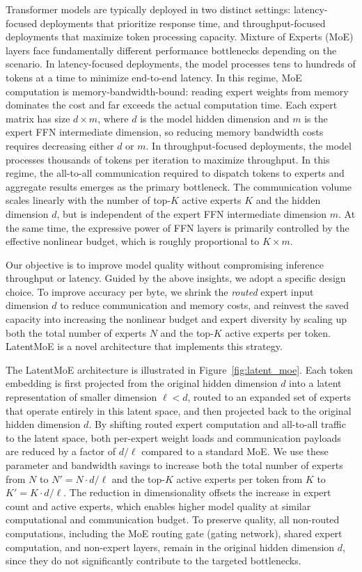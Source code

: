 \documentclass[11pt, logo, onecolumn, copyright, colorlinks=true, allcolors=blue]{nvidiatechreport}
\begin{document}
Transformer models are typically deployed in two distinct settings: latency-focused deployments that prioritize response time, and throughput-focused deployments that maximize token processing capacity.
Mixture of Experts (MoE) layers face fundamentally different performance bottlenecks depending on the scenario.
In latency-focused deployments, the model processes tens to hundreds of tokens at a time to minimize end-to-end latency. In this regime, MoE computation is memory-bandwidth-bound: reading expert weights from memory dominates the cost and far exceeds the actual computation time. Each expert matrix has size $d \times m$, where $d$ is the model hidden dimension and $m$ is the expert FFN intermediate dimension, so reducing memory bandwidth costs requires decreasing either $d$ or $m$.
In throughput-focused deployments, the model processes thousands of tokens per iteration to maximize throughput. In this regime, the all-to-all communication required to dispatch tokens to experts and aggregate results emerges as the primary bottleneck. The communication volume scales linearly with the number of top-$K$ active experts $K$ and the hidden dimension $d$, but is independent of the expert FFN intermediate dimension $m$.
At the same time, the expressive power of FFN layers is primarily controlled by the effective nonlinear budget, which is roughly proportional to $K \times m$.

Our objective is to improve model quality without compromising inference throughput or latency.
Guided by the above insights, we adopt a specific design choice. To improve accuracy per byte, we shrink the \emph{routed} expert input dimension $d$ to reduce communication and memory costs, and reinvest
the saved capacity into increasing the nonlinear budget and expert diversity by scaling up both the
total number of experts $N$ and the top-$K$ active experts per token. LatentMoE is a novel architecture that implements this strategy.

The LatentMoE architecture is illustrated in Figure~\ref{fig:latent_moe}. Each token embedding is first projected from the original hidden dimension $d$ into a latent representation of smaller dimension $\ell < d$, routed to an expanded set of experts that operate entirely in this latent space, and then projected back to the original hidden dimension $d$.
By shifting routed expert computation and all-to-all traffic to the latent space, both per-expert weight loads and communication payloads are reduced by a factor of $d / \ell$ compared to a standard MoE. 
We use these parameter and bandwidth savings to increase both the total number of experts from $N$ to $N' = N \cdot d / \ell$ and the top-$K$ active experts per token from
$K$ to $K' = K \cdot d / \ell$. The reduction in dimensionality offsets the increase in expert count and active experts, which enables higher model quality at similar computational and communication budget.
To preserve quality, all non-routed computations, including the MoE routing gate (gating network), shared expert computation, and non-expert layers, remain in the original hidden dimension $d$, since they do not significantly contribute to the targeted bottlenecks.
\end{document}

